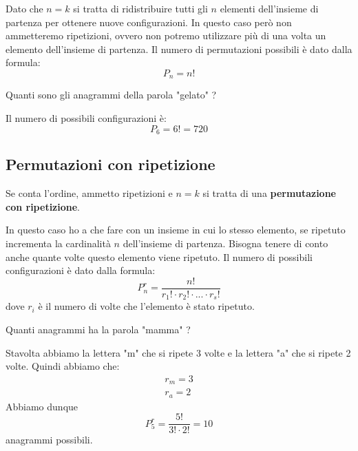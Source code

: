 Dato che $n = k$ si tratta di ridistribuire tutti gli $n$ elementi dell'insieme di partenza per
ottenere nuove configurazioni. In questo caso per\`o non ammetteremo ripetizioni, ovvero non
potremo utilizzare pi\`u di una volta un elemento dell'insieme di partenza.
Il numero di permutazioni possibili \`e dato dalla formula:
\begin{equation*}
	P_n = n!
\end{equation*}

\begin{example}
	Quanti sono gli anagrammi della parola "gelato" ?

	Il numero di possibili configurazioni \`e:
	\begin{equation*}
		P_{6} = 6! = 720
	\end{equation*}
\end{example}

\subsection{Permutazioni con ripetizione}
\begin{defn}
	Se conta l'ordine, ammetto ripetizioni e $n = k$ si tratta di una
	\textbf{permutazione con ripetizione}.
\end{defn}

In questo caso ho a che fare con un insieme in cui lo stesso elemento, se ripetuto incrementa
la cardinalit\`a $n$ dell'insieme di partenza. Bisogna tenere di conto anche quante volte
questo elemento viene ripetuto.
Il numero di possibili configurazioni \`e dato dalla formula:
\begin{equation*}
	P_n^r = \frac{n!}{r_1! \cdot r_2! \cdot ... \cdot r_s!}
\end{equation*}
dove $r_i$ \`e il numero di volte che l'elemento \`e stato ripetuto.

\begin{example}
	Quanti anagrammi ha la parola "mamma" ?

	Stavolta abbiamo la lettera "m" che si ripete 3 volte e la lettera "a" che si ripete 2 volte.
	Quindi abbiamo che:
	\begin{equation*}
		\begin{array}{c}
			r_m = 3 \\
			r_a = 2
		\end{array}
	\end{equation*}
	Abbiamo dunque
	\begin{equation*}
		P_5^r = \frac{5!}{3! \cdot 2!} = 10
	\end{equation*}
	anagrammi possibili.
\end{example}

